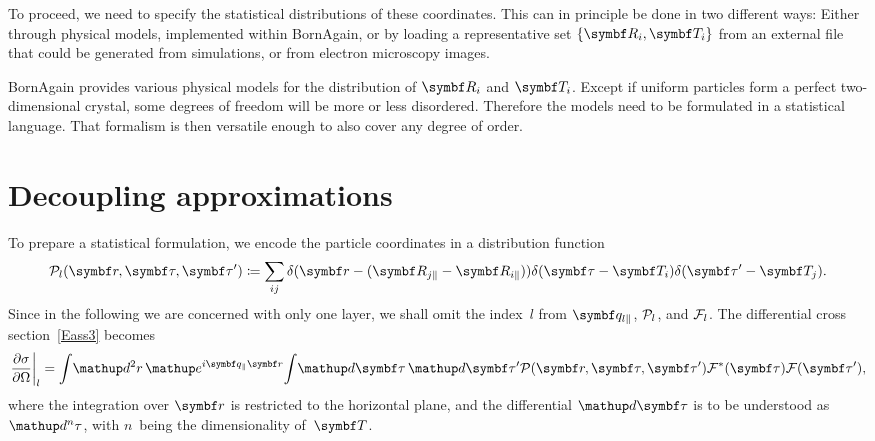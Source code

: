 To proceed,
we need to specify the statistical distributions
of these coordinates.
This can in principle be done in two different ways:
Either through physical models, implemented within BornAgain,
or by loading a representative set $\{\R_i,\v{T}_i\}$
from an external  file
that could be generated from simulations,
or from electron microscopy images.

\addtocounter{footnote}{1}

BornAgain provides various physical models
for the distribution of $\R_i$ and $\v{T}_i$.
Except if uniform particles form a perfect two-dimensional crystal,
some degrees of freedom will be more or less disordered.
Therefore the models need to be formulated in a statistical language.
That formalism is then versatile enough to also cover any degree of order.

\section{Decoupling approximations}\label{Spartidis}

To prepare a statistical formulation,
we encode the particle coordinates in a distribution function
%
%
%
\begin{equation}\label{EPDdeltas}
  \PD_{l}(\r,\v\tau,\v\tau')
  \coloneqq \sum_{ij} \delta(\r-(\R_{j\plll}-\R_{i\plll}))
  \delta(\v\tau-\v{T}_i)\delta(\v\tau'-\v{T}_j).
\end{equation}
Since in the following we are concerned with only one layer,
we shall omit the index~$l$ from $\q_{l\plll}$, $\mathcal{P}_l$, and $\mathcal{F}_l$.
The differential cross section~\cref{Eass3} becomes
\begin{equation}\label{Epdm1}
  \left.\frac{\partial\sigma}{\partial\Omega}\right|_l
  =
  \int\!\d^2r\,   \e^{i\q_{\plll}\r}\!
  \int\! \d\v{\tau}\, \d\v{\tau}'
    \PD(\r,\v\tau,\v\tau')
    \FD^*(\v\tau) \FD(\v\tau'),
\end{equation}
where the integration over $\r$ is restricted to the horizontal plane,
and the differential $\d\v{\tau}$ is to be understood as $\d^n\tau$,
with $n$~being the dimensionality of~$\v{T}$.

